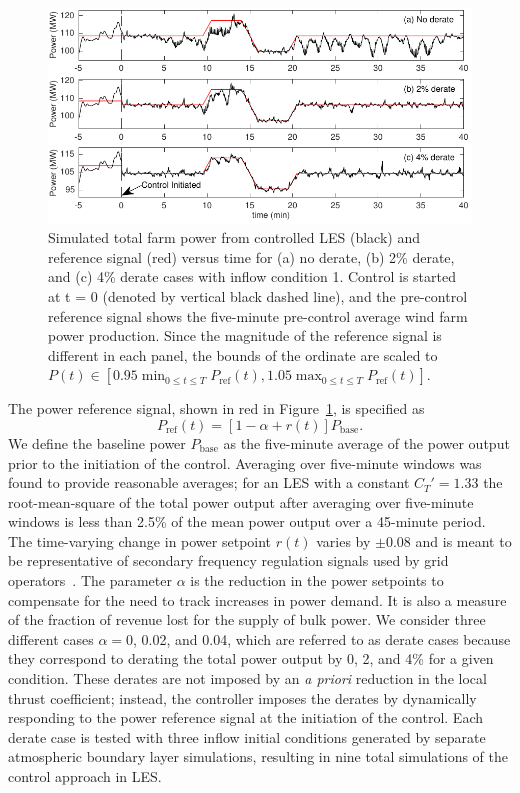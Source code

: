\begin{figure}[h]
\begin{center}
\includegraphics[width=\textwidth]{./fig/Pfarm.pdf}
\caption{Simulated total farm power from controlled LES (black) and reference signal (red) versus time for (a) no derate, (b) 2\% derate, and (c) 4\% derate cases with inflow condition 1. Control is started at t = 0 (denoted by vertical black dashed line), and the pre-control reference signal shows the five-minute pre-control average wind farm power production. Since the magnitude of the reference signal is different in each panel, the bounds of the ordinate are scaled to $P(t) \in [0.95 \min_{0 \le t \le T} P_\text{ref}(t), 1.05\max_{0 \le t \le T}  P_\text{ref}(t)]$.}
\label{fig:Pfarm}
\end{center}
\end{figure}

The power reference signal, shown in red in Figure~\ref{fig:Pfarm}, is specified as 
\begin{equation}
P_\text{ref}(t) = [1-\alpha + r(t) ]P_\text{base}.
\end{equation}
We define the baseline power $P_\text{base}$ as the five-minute average of the power output prior to the initiation of the control. Averaging over five-minute windows was found to provide reasonable averages; for an LES with a constant $C_T' = 1.33$ the root-mean-square of the total power output after averaging over five-minute windows is less than 2.5\% of the mean power output over a 45-minute period. The time-varying change in power setpoint $r(t)$ varies by $\pm 0.08$ and is meant to be representative of secondary frequency regulation signals used by grid operators~\cite{PJMm12}. The parameter $\alpha$ is the reduction in the power setpoints to compensate for the need to track increases in power demand. It is also a measure of the fraction of revenue lost for the supply of bulk power. We consider three different cases $\alpha = 0$, 0.02, and 0.04, which are referred to as derate cases because they correspond to derating the total power output by 0, 2, and 4\% for a given condition. These derates are not imposed by an \textit{a priori} reduction in the local thrust coefficient; instead, the controller imposes the derates by dynamically responding to the power reference signal at the initiation of the control. Each derate case is tested with three inflow initial conditions generated by separate atmospheric boundary layer simulations, resulting in nine total simulations of the control approach in LES.

